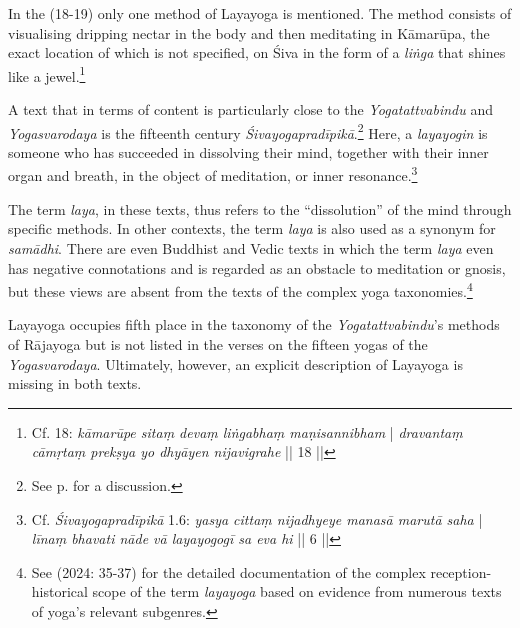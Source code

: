 In the  (18-19) only one method of Layayoga is mentioned. The method consists of visualising dripping nectar in the body and then meditating in Kāmarūpa, the exact location of which is not specified, on Śiva in the form of a \textit{liṅga} that shines like a jewel.\footnote{Cf.  18: \textit{kāmarūpe sitaṃ devaṃ liṅgabhaṃ maṇisannibham } | \textit{dravantaṃ cāmṛtaṃ prekṣya yo dhyāyen nijavigrahe} || 18 ||}

A text that in terms of content is particularly close to the \textit{Yogatattvabindu} and \textit{Yogasvarodaya} is the fifteenth century \emph{Śivayogapradīpikā}.\footnote{See p. \pageref{sivayogaintro2} for a discussion.} Here, a \textit{layayogin} is someone who has succeeded in dissolving their mind, together with their inner organ and breath, in the object of meditation, or inner resonance.\footnote{Cf. \emph{Śivayogapradīpikā} 1.6: \textit{yasya cittaṃ nijadhyeye manasā marutā saha} | \textit{līnaṃ bhavati nāde vā layayogogī sa eva hi} || 6 ||} 

 The term \textit{laya}, in these texts, thus refers to the ``dissolution'' of the mind through specific methods. In other contexts, the term \textit{laya} is also used as a synonym for \textit{samādhi}. There are even Buddhist and Vedic texts in which the term \textit{laya} even has negative connotations and is regarded as an obstacle to meditation or gnosis, but these views are absent from the texts of the complex yoga taxonomies.\footnote{See \citeauthor{amaraugha2024} (2024: 35-37) for the detailed documentation of the complex reception-historical scope of the term \textit{layayoga} based on evidence from numerous texts of yoga's relevant subgenres.}

 Layayoga occupies fifth place in the taxonomy of the \textit{Yogatattvabindu}'s methods of Rājayoga but is not listed in the verses on the fifteen yogas of the \textit{Yogasvarodaya}. Ultimately, however, an explicit description of Layayoga is missing in both texts.

